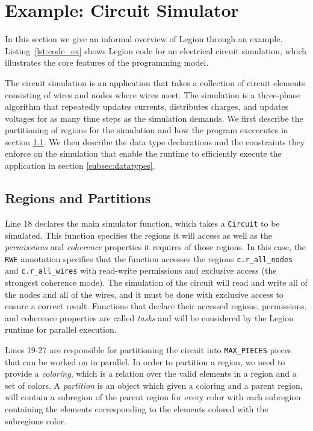 \section{Example: Circuit Simulator}
\label{sec:ex}

%

In this section we give an informal overview of Legion through an example.
Listing~\ref{lst:code_ex} shows Legion code for an electrical
circuit simulation, which illustrates the core features of the programming model.

The circuit simulation is an application that takes a collection of
circuit elements consisting of wires and nodes where wires meet.  
The simulation is a three-phase algorithm that repeatedly updates
currents, distributes charges, and updates voltages for as many
time steps as the simulation demands.  We first
describe the partitioning of regions for the simulation and how
the program exececutes in section \ref{subsec:partitioning}.  
We then describe the data type declarations 
and the constraints they enforce on the simulation that enable
the runtime to efficiently execute the application
in section \ref{subsec:datatypes}.

\subsection{Regions and Partitions}
\label{subsec:partitioning}

Line 18 declares the main simulator function, which takes a
{\tt Circuit} to be simulated.  This function specifies the regions it
will access as well as the {\em permissions} and {\em coherence}
properties it requires of those regions.  In this case, the {\tt RWE}
annotation specifies that the function accesses the regions {\tt c.r\_all\_nodes}
and {\tt c.r\_all\_wires} with read-write permissions and exclusive
access (the strongest coherence mode).  The simulation of the circuit
will read and write all of the nodes and all of the wires, and it must
be done with exclusive access to ensure a correct result.  Functions that
declare their accessed regions, permissions, and coherence properties are
called {\em tasks} and will be considered by the Legion runtime for parallel
execution.

Lines 19-27 are responsible for partitioning the circuit into {\tt MAX\_PIECES}
pieces that can be worked on in parallel.  In order to partition a region, we
need to provide a {\em coloring}, which is a relation over the valid elements
in a region and a set of colors.  A {\em partition} is an object which given
a coloring and a parent region, will contain a subregion of the parent region
for every color with each subregion containing the elements corresponding 
to the elements colored with the subregions color. 

